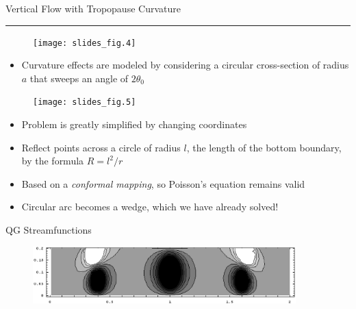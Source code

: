 \documentclass[landscape]{seminar}
\begin{document}
\begin{slide}

\begin{center}
{\color{darkblue} \large Vertical Flow with Tropopause Curvature \\ \rule[0.15in]{\textwidth}{.03in}}

\begin{figure}
\texttt{[image: slides\_fig.4]}
\end{figure}
\end{center}

\begin{itemize}
\item Curvature effects are modeled by considering a circular cross-section of radius $a$ that sweeps an angle of $2 \theta_0$
\end{itemize}

\end{slide}
\begin{slide}

\begin{center}
\begin{figure}
\texttt{[image: slides\_fig.5]}
\end{figure}
\end{center}

\begin{itemize}
\item Problem is greatly simplified by changing coordinates

\item Reflect points across a circle of radius $l$, the length of the bottom boundary, by the formula $R = l^2 / r$

\item Based on a \emph{conformal mapping}, so Poisson's equation remains valid

\item Circular arc becomes a wedge, which we have already solved!

\end{itemize}

\end{slide}
\begin{slide}

\begin{center}
QG Streamfunctions
\begin{figure}
\includegraphics[width=4in]{img/qg_curve_n16_3src_mid.eps}
\end{figure}
\end{center}

\end{slide}
\end{document}
